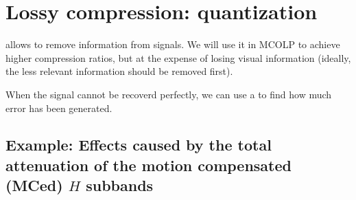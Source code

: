 



\section{Lossy compression: quantization}

 allows to remove information from
signals. We will use it in MCOLP to achieve higher compression ratios,
but at the expense of losing visual information (ideally, the less
relevant information should be removed first).

When the signal cannot be recoverd perfectly, we can use a
 to find how much error
has been generated.


\subsection*{Example: Effects caused by the total attenuation of the motion compensated (MCed) $H$ subbands}

